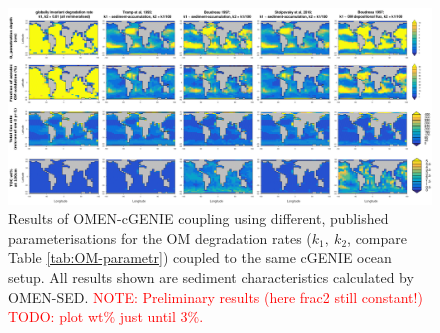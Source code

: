 \documentclass[gmd, manuscript]{copernicus}
\begin{document}

% 

\begin{figure}
	\includegraphics[width=1.0\textwidth]{figures/OMEN-GENIE-Exp/1_Examples_OMEN_GENIE_1404.pdf}
	\caption{Results of OMEN-cGENIE coupling using different, published parameterisations for the OM degradation rates ($k_1,\ k_2$, compare Table \ref{tab:OM-parametr}) 
	coupled to the same cGENIE ocean setup. All results shown are sediment characteristics calculated by OMEN-SED.
	\textcolor{red}{ NOTE: Preliminary results (here frac2 still constant!)
TODO: plot wt\% just until 3\%.}}
	\label{fig:GENIE_OMEN_Exps}
\end{figure}
\end{document}
